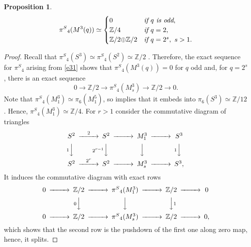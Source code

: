 \documentclass[12pt,a4paper]{amsart}
\newtheorem{prop}[theorem]{Proposition}
\theoremstyle{definition}
\theoremstyle{remark}
\numberwithin{equation}{section}
\begin{document}
 \begin{prop}\label{32}
 \[ 
 {\pi^S}_4(M^3(q))\simeq
 \begin{cases}
  0 &\text{\em if $q$ is odd},\\
  {\mathbb Z}/4 &\text{\em if } q=2,\\
  {\mathbb Z}/2{\oplus}{\mathbb Z}/2 &\text{\em if } q=2^s,\ s>1. 
 \end{cases}
 \]
 \end{prop}  
 \begin{proof}
  Recall that ${\pi^S}_4(S^3)\simeq{\pi^S}_4(S^2)\simeq{\mathbb Z}/2$ \cite[Theorems~15.1,\,15.2]{hu}.
 Therefore, the exact sequence for ${\pi^S}_4$ arising from \eqref{e31} shows that ${\pi^S}_4(M^3(q))=0$
 for $q$ odd and, for $q=2^s$, there is an exact sequence
 \[
  0\to {\mathbb Z}/2\to {\pi^S}_4(M^3_s) \to {\mathbb Z}/2\to 0.
 \]
 Note that ${\pi^S}_4(M^3_1)\simeq\pi_6(M^5_1)$, so \cite[Lemma~10.2]{hu} implies that it embeds
 into $\pi_6(S^3)\simeq{\mathbb Z}/12$ \cite[Theorem~16.1]{hu}. Hence, ${\pi^S}_4(M^3_1)\simeq{\mathbb Z}/4$.
 For $r>1$ consider the commutative diagram of triangles
 \begin{equation}\label{e33}
  \begin{CD}
   S^2 @>2>> S^2 @>>> M^3_1 @>>> S^3 \\
  @V1VV	@V2^{r-1}VV	@VVV	@V1VV	\\	
   S^2 @>2^r>> S^2 @>>> M^3_s@>>> S^3 , 
 \end{CD} 
 \end{equation}
 It induces the commutative diagram with exact rows
 \[
 \begin{CD}
  0 @>>> {\mathbb Z}/2 @>>> {\pi^S}_4(M^3_1) @>>> {\mathbb Z}/2 @>>> 0 \\
  && @V0VV	@VVV 	@VV1V \\
  0 @>>> {\mathbb Z}/2 @>>> {\pi^S}_4(M^3_s) @>>> {\mathbb Z}/2 @>>> 0 ,
 \end{CD} 
 \]
 which shows that the second row is the pushdown of the first one along zero map,
 hence, it splits.
 \end{proof}
\end{document}

